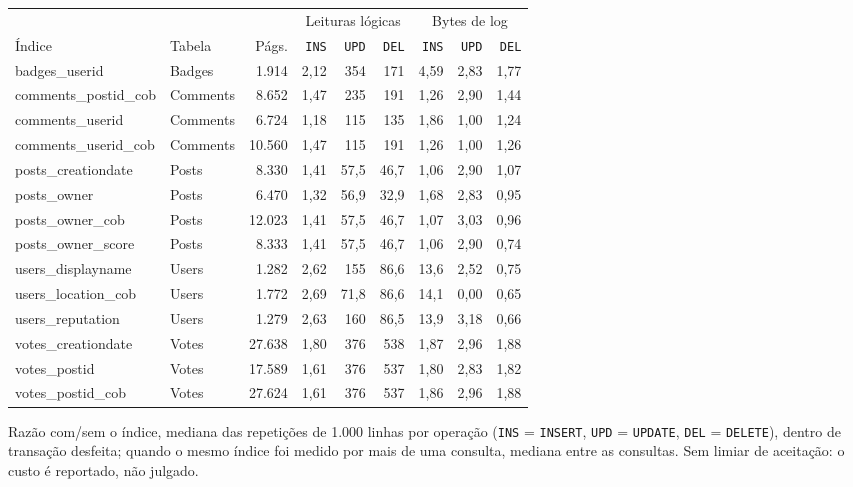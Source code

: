 {\footnotesize\setlength{\tabcolsep}{3pt}
\begin{tabular}{llrrrrrrr}
\toprule
 &  &  & \multicolumn{3}{c}{Leituras lógicas} & \multicolumn{3}{c}{Bytes de log} \\
\cmidrule(lr){4-6}\cmidrule(lr){7-9}
Índice & Tabela & Págs. & \texttt{INS} & \texttt{UPD} & \texttt{DEL} & \texttt{INS} & \texttt{UPD} & \texttt{DEL} \\
\midrule
badges\_userid & Badges & 1.914 & 2,12 & 354 & 171 & 4,59 & 2,83 & 1,77 \\
comments\_postid\_cob & Comments & 8.652 & 1,47 & 235 & 191 & 1,26 & 2,90 & 1,44 \\
comments\_userid & Comments & 6.724 & 1,18 & 115 & 135 & 1,86 & 1,00 & 1,24 \\
comments\_userid\_cob & Comments & 10.560 & 1,47 & 115 & 191 & 1,26 & 1,00 & 1,26 \\
posts\_creationdate & Posts & 8.330 & 1,41 & 57,5 & 46,7 & 1,06 & 2,90 & 1,07 \\
posts\_owner & Posts & 6.470 & 1,32 & 56,9 & 32,9 & 1,68 & 2,83 & 0,95 \\
posts\_owner\_cob & Posts & 12.023 & 1,41 & 57,5 & 46,7 & 1,07 & 3,03 & 0,96 \\
posts\_owner\_score & Posts & 8.333 & 1,41 & 57,5 & 46,7 & 1,06 & 2,90 & 0,74 \\
users\_displayname & Users & 1.282 & 2,62 & 155 & 86,6 & 13,6 & 2,52 & 0,75 \\
users\_location\_cob & Users & 1.772 & 2,69 & 71,8 & 86,6 & 14,1 & 0,00 & 0,65 \\
users\_reputation & Users & 1.279 & 2,63 & 160 & 86,5 & 13,9 & 3,18 & 0,66 \\
votes\_creationdate & Votes & 27.638 & 1,80 & 376 & 538 & 1,87 & 2,96 & 1,88 \\
votes\_postid & Votes & 17.589 & 1,61 & 376 & 537 & 1,80 & 2,83 & 1,82 \\
votes\_postid\_cob & Votes & 27.624 & 1,61 & 376 & 537 & 1,86 & 2,96 & 1,88 \\
\bottomrule
\end{tabular}\par
\vspace{3pt}
\begin{minipage}{\linewidth}\footnotesize
Razão com/sem o índice, mediana das repetições de 1.000 linhas por operação (\texttt{INS} = \texttt{INSERT}, \texttt{UPD} = \texttt{UPDATE}, \texttt{DEL} = \texttt{DELETE}), dentro de transação desfeita; quando o mesmo índice foi medido por mais de uma consulta, mediana entre as consultas. Sem limiar de aceitação: o custo é reportado, não julgado.
\end{minipage}}
